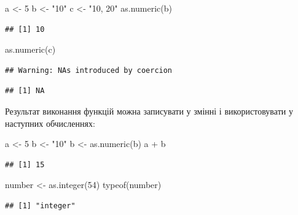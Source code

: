 \documentclass[
]{book}
\newenvironment{Shaded}{\begin{snugshade}}{\end{snugshade}}
\newcommand{\DecValTok}[1]{\textcolor[rgb]{0.00,0.00,0.81}{#1}}
\newcommand{\FunctionTok}[1]{\textcolor[rgb]{0.00,0.00,0.00}{#1}}
\newcommand{\NormalTok}[1]{#1}
\newcommand{\OtherTok}[1]{\textcolor[rgb]{0.56,0.35,0.01}{#1}}
\newcommand{\SpecialCharTok}[1]{\textcolor[rgb]{0.00,0.00,0.00}{#1}}
\newcommand{\StringTok}[1]{\textcolor[rgb]{0.31,0.60,0.02}{#1}}
\begin{document}
\begin{Shaded}
\begin{Highlighting}[]
\NormalTok{a }\OtherTok{\textless{}{-}} \DecValTok{5}
\NormalTok{b }\OtherTok{\textless{}{-}} \StringTok{"10"}
\NormalTok{c }\OtherTok{\textless{}{-}} \StringTok{"10, 20"}
\FunctionTok{as.numeric}\NormalTok{(b)}
\end{Highlighting}
\end{Shaded}

\begin{verbatim}
## [1] 10
\end{verbatim}

\begin{Shaded}
\begin{Highlighting}[]
\FunctionTok{as.numeric}\NormalTok{(c)}
\end{Highlighting}
\end{Shaded}

\begin{verbatim}
## Warning: NAs introduced by coercion
\end{verbatim}

\begin{verbatim}
## [1] NA
\end{verbatim}

Результат виконання функцій можна записувати у змінні і використовувати у наступних обчисленнях:

\begin{Shaded}
\begin{Highlighting}[]
\NormalTok{a }\OtherTok{\textless{}{-}} \DecValTok{5}
\NormalTok{b }\OtherTok{\textless{}{-}} \StringTok{"10"}
\NormalTok{b }\OtherTok{\textless{}{-}} \FunctionTok{as.numeric}\NormalTok{(b)}
\NormalTok{a }\SpecialCharTok{+}\NormalTok{ b}
\end{Highlighting}
\end{Shaded}

\begin{verbatim}
## [1] 15
\end{verbatim}

\begin{Shaded}
\begin{Highlighting}[]
\NormalTok{number }\OtherTok{\textless{}{-}} \FunctionTok{as.integer}\NormalTok{(}\DecValTok{54}\NormalTok{)}
\FunctionTok{typeof}\NormalTok{(number)}
\end{Highlighting}
\end{Shaded}

\begin{verbatim}
## [1] "integer"
\end{verbatim}
\end{document}
